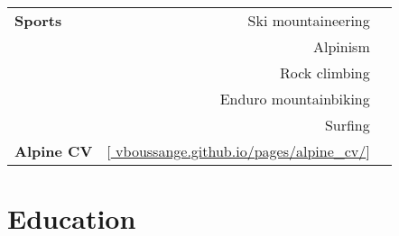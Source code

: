 \begin{tabular}{l r r}
  \textbf{\color{ctcolortitle}Sports} & Ski mountaineering \\
          & Alpinism &\\
          & Rock climbing &\\
          & Enduro mountainbiking &\\
          & Surfing \\
\textbf{\color{ctcolortitle}Alpine CV}  & [\hyperlink{https://vboussange.github.io/pages/alpine_cv/}{{\color{ctcoloraccessory} vboussange.github.io/pages/alpine\_cv/}}]
  \end{tabular}

\section*{Education}
